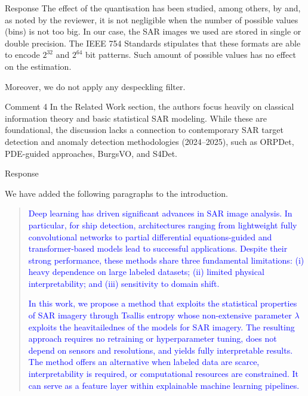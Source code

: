 \documentclass[11pt]{report}
\begin{document}
\begin{responsebox}{Response}
The effect of the quantisation has been studied, among others, by \citet{beirlant1997nonparametric} and, as noted by the reviewer, it is not negligible when the number of possible values (bins) is not too big.
In our case, the SAR images we used are stored in single or double precision.
The IEEE 754 Standards stipulates that these formats are able to encode $2^{32}$ and $2^{64}$ bit patterns.
Such amount of possible values has no effect on the estimation.

Moreover, we do not apply any despeckling filter.

\end{responsebox}

\vspace{1em}


\begin{reviewbox}{Comment 4}
In the Related Work section, the authors focus heavily on classical information theory and basic statistical SAR modeling. While these are foundational, the discussion lacks a connection to contemporary SAR target detection and anomaly detection methodologies (2024--2025), such as ORPDet, PDE-guided approaches, BurgsVO, and S4Det.
\end{reviewbox}

\begin{responsebox}{Response}

We have added the following paragraphs to the introduction.

\begin{quote}
\textcolor{blue}{
Deep learning has driven significant advances in SAR image analysis.
In particular, for ship detection, architectures ranging from lightweight fully convolutional networks \citep{ORPSDOuterRectangularProjectionBasedRepresentationforOrientedShipDetectioninSARImages} to partial differential equations-guided and transformer-based models \citep{PDEGuidedDiverseFeatureLearningforSARRotatedShipDetection, BurgsVOBurgsAssociatedVertexOffsetEncodingSchemeforDetectingRotatedShipsinSARImages, S4DetBreadthandAccurateSineSingleStageShipDetectionforRemoteSenseSARImagery}
lead to successful applications.
Despite their strong performance, these methods share three fundamental limitations: (i) heavy dependence on large labeled datasets; (ii) limited physical interpretability; and (iii) sensitivity to domain shift.}

\textcolor{blue}{
In this work, we propose a method that exploits the statistical properties of SAR imagery through Tsallis entropy whose non-extensive parameter $\lambda$ exploits the heavitailednes of the models for SAR imagery. 
The resulting approach requires no retraining or hyperparameter tuning, does not depend on sensors and resolutions, and yields fully interpretable results. 
The method offers an alternative when labeled data are scarce, interpretability is required, or computational resources are constrained.
It can serve as a feature layer within explainable machine learning pipelines.
}
\end{quote}
\end{responsebox}




\end{document}
